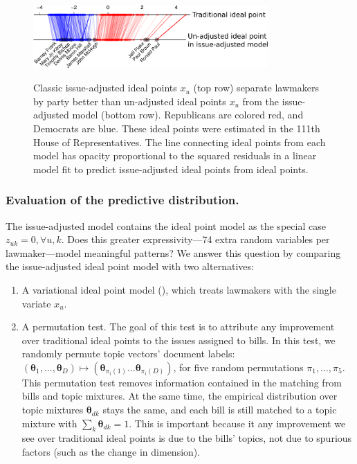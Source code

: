 \begin{figure}
  \center
  \includegraphics[width=0.8\textwidth]{chapter_spatial_voting_with_text/figures/3393_issue_vs_ideal_sxs.pdf}
  \label{figure:jackman_vs_offset}
  \caption{Classic issue-adjusted ideal points $x_u$ (top row) separate lawmakers by party better than un-adjusted ideal points $x_u$ from the
    issue-adjusted model (bottom row).  Republicans are colored red,
    and Democrats are blue.  These ideal points were estimated in
    the 111th House of Representatives.  The line connecting ideal points from
    each model has opacity proportional to the squared residuals in a linear
    model fit to predict issue-adjusted ideal points from ideal
    points. }
\end{figure}

\subsubsection{Evaluation of the predictive distribution.}

The issue-adjusted model contains the ideal point model as the
special case $z_{uk}=0, \forall u, k$. Does this greater
expressivity---74 extra random variables per lawmaker---model
meaningful patterns?  We answer this question by comparing the
issue-adjusted ideal point model with two alternatives:

\begin{enumerate}
\item A variational ideal point model (), which treats
  lawmakers with the single variate $x_u$.

\item A permutation test.  The goal of this test is to attribute any
  improvement over traditional ideal points to the issues assigned to
  bills.  In this test, we randomly permute topic vectors' document
  labels: $(\bm \theta_1, \ldots, \bm \theta_D) \mapsto (\bm
  \theta_{\pi_i(1)} \ldots \bm \theta_{\pi_i(D)})$, for five random
  permutations $\pi_1, \ldots, \pi_{5}$.  This permutation test
  removes information contained in the matching from bills and topic
  mixtures.  At the same time, the empirical distribution over topic
  mixtures $\bm \theta_{dk}$ stays the same, and each bill is still
  matched to a topic mixture with $\sum_k \bm \theta_{dk} = 1$.  This
  is important because it any improvement we see over traditional
  ideal points is due to the bills' topics, not due to spurious
  factors (such as the change in dimension).
\end{enumerate}

